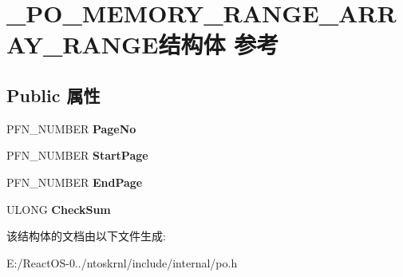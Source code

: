 \hypertarget{struct___p_o___m_e_m_o_r_y___r_a_n_g_e___a_r_r_a_y___r_a_n_g_e}{}\section{\+\_\+\+P\+O\+\_\+\+M\+E\+M\+O\+R\+Y\+\_\+\+R\+A\+N\+G\+E\+\_\+\+A\+R\+R\+A\+Y\+\_\+\+R\+A\+N\+G\+E结构体 参考}
\label{struct___p_o___m_e_m_o_r_y___r_a_n_g_e___a_r_r_a_y___r_a_n_g_e}
\subsection*{Public 属性}
\begin{DoxyCompactItemize}
\item 
\mbox{\label{struct___p_o___m_e_m_o_r_y___r_a_n_g_e___a_r_r_a_y___r_a_n_g_e_af8beea09e510aed96238b4b3c46f3a65}} 
P\+F\+N\+\_\+\+N\+U\+M\+B\+ER {\bfseries Page\+No}
\item 
\mbox{\label{struct___p_o___m_e_m_o_r_y___r_a_n_g_e___a_r_r_a_y___r_a_n_g_e_af4fc0eecdbde0b3e7ddb591fcf86314d}} 
P\+F\+N\+\_\+\+N\+U\+M\+B\+ER {\bfseries Start\+Page}
\item 
\mbox{\label{struct___p_o___m_e_m_o_r_y___r_a_n_g_e___a_r_r_a_y___r_a_n_g_e_a2260f4a56a72dfa5de7cd60785b8cb86}} 
P\+F\+N\+\_\+\+N\+U\+M\+B\+ER {\bfseries End\+Page}
\item 
\mbox{\label{struct___p_o___m_e_m_o_r_y___r_a_n_g_e___a_r_r_a_y___r_a_n_g_e_ae2b014d468b5eac0d62f4b61aac3a9a1}} 
U\+L\+O\+NG {\bfseries Check\+Sum}
\end{DoxyCompactItemize}


该结构体的文档由以下文件生成\+:\begin{DoxyCompactItemize}
\item 
E\+:/\+React\+O\+S-\/0../ntoskrnl/include/internal/po.\+h\end{DoxyCompactItemize}

